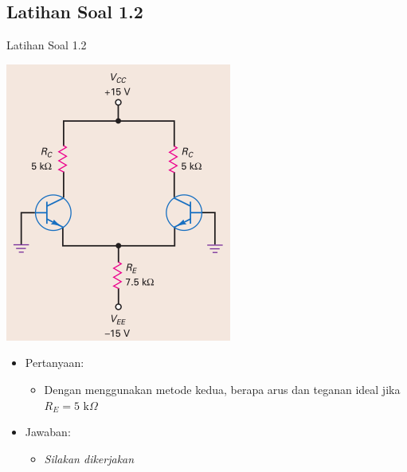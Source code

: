 \documentclass[aspectratio=169]{beamer}
\begin{document}
\subsection{Latihan Soal 1.2}
\begin{frame}{Latihan Soal 1.2}
	\begin{multicols}{2}
		\begin{center}
			\includegraphics[width=0.6\textheight]{gambar/01.latihan_soal_1a}
		\end{center}
		\columnbreak
		\begin{itemize}
			\item Pertanyaan:
			\begin{itemize}
				\item Dengan menggunakan metode kedua, berapa arus dan teganan ideal jika $ R_E = 5 \text{ k}\Omega $
			\end{itemize}
			\item Jawaban:
			\begin{itemize}
				\item \textit{Silakan dikerjakan}
			\end{itemize}
		\end{itemize}
		\vfill\null
	\end{multicols}
\end{frame}
\end{document}
